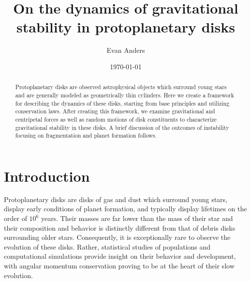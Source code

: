\documentclass[aps,pra, twocolumn]{revtex4-1}
\begin{document}
\title{On the dynamics of gravitational stability in protoplanetary disks}

\author{Evan Anders}


\date{\today}

\begin{abstract}
Protoplanetary disks are observed astrophysical objects which surround young stars and are generally modeled as geometrically thin cylinders.  Here we create a framework for describing the dynamics of these disks, starting from base principles and utilizing conservation laws.  After creating this framework, we examine gravitational and centripetal forces as well as random motions of disk constituents to characterize gravitational stability in these disks.  A brief discussion of the outcomes of instability focusing on  fragmentation and planet formation follows.
\end{abstract}



\maketitle


\section{\label{section1} Introduction}

Protoplanetary disks are disks of gas and dust which surround young stars, display early conditions of planet formation, and typically display lifetimes on the order of $10^6$ years.  Their masses are far lower than the mass of their star and their composition and behavior is distinctly different from that of debris disks surrounding older stars.  Consequently, it is exceptionally rare to observe the evolution of these disks.  Rather, statistical studies of populations and computational simulations provide insight on their behavior and development, with angular momentum conservation proving to be at the heart of their slow evolution.   \cite{armitage2011}
\end{document}
